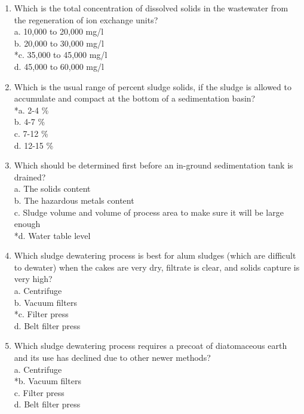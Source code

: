 \begin{enumerate}
  \item Which is the total concentration of dissolved solids in the wastewater from the regeneration of ion exchange units?\\
a. 10,000 to 20,000 mg/l\\
b. 20,000 to 30,000 mg/l\\
*c. 35,000 to 45,000 mg/l\\
d. 45,000 to 60,000 mg/l\\
  \item Which is the usual range of percent sludge solids, if the sludge is allowed to accumulate and compact at the bottom of a sedimentation basin?\\
*a. 2-4 \%\\
b. 4-7 \%\\
c. 7-12 \%\\
d. 12-15 \% \\
\item Which should be determined first before an in-ground sedimentation tank is drained?\\
a. The solids content\\
b. The hazardous metals content\\
c. Sludge volume and volume of process area to make sure it will be large enough\\
*d. Water table level\\
  \item Which sludge dewatering process is best for alum sludges (which are difficult to dewater) when the cakes are very dry, filtrate is clear, and solids capture is very high?\\
a. Centrifuge\\
b. Vacuum filters\\
*c. Filter press\\
d. Belt filter press\\
  \item Which sludge dewatering process requires a precoat of diatomaceous earth and its use has declined due to other newer methods?\\
a. Centrifuge\\
*b. Vacuum filters\\
c. Filter press\\
d. Belt filter press\\


\end{enumerate}
